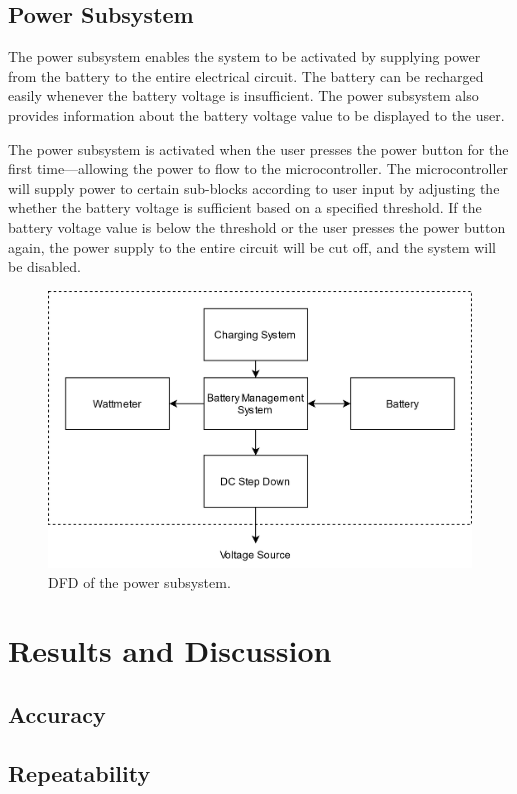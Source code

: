 \documentclass[conference]{IEEEtran}
\begin{document}
\subsection{Power Subsystem}
The power subsystem enables the system to be activated by supplying power from the battery to the entire electrical circuit. The battery can be recharged easily whenever the battery voltage is insufficient. The power subsystem also provides information about the battery voltage value to be displayed to the user. 

The power subsystem is activated when the user presses the power button for the first time—allowing the power to flow to the microcontroller. The microcontroller will supply power to certain sub-blocks according to user input by adjusting the whether the battery voltage is sufficient based on a specified threshold. If the battery voltage value is below the threshold or the user presses the power button again, the power supply to the entire circuit will be cut off, and the system will be disabled.

    \begin{figure}[htbp]
    \centerline{\includegraphics{power-dfd.png}}
    \caption{DFD of the power subsystem.}
    \label{power-dfd}
    \end{figure}

\section{Results and Discussion}
\subsection{Accuracy}
\subsection{Repeatability}
\end{document}
